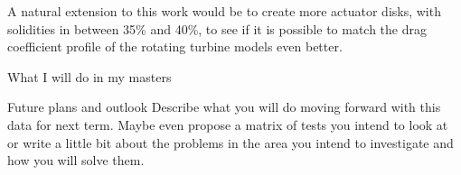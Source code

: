 
A natural extension to this work would be to create more actuator disks, with solidities in between 35\% and 40\%, to see if it is possible to match the drag coefficient profile of the rotating turbine models even better.  

What I will do in my masters 


Future plans and outlook
Describe what you will do moving forward with this data for next term.  Maybe even propose a matrix of tests you intend to look at or write a little bit about the problems in the area you intend to investigate and how you will solve them.